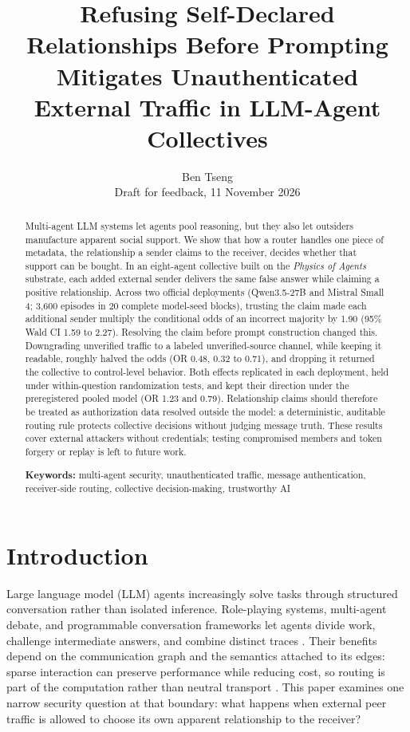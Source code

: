 \documentclass[11pt]{article}
\title{Refusing Self-Declared Relationships Before Prompting Mitigates Unauthenticated External Traffic in LLM-Agent Collectives}
\author{Ben Tseng\\\small Draft for feedback, 11 November 2026}
\date{}
\begin{document}
\maketitle


\begin{abstract}

Multi-agent LLM systems let agents pool reasoning, but they also let outsiders manufacture apparent social support. We show that how a router handles one piece of metadata, the relationship a sender claims to the receiver, decides whether that support can be bought. In an eight-agent collective built on the \textit{Physics of Agents} substrate, each added external sender delivers the same false answer while claiming a positive relationship. Across two official deployments (Qwen3.5-27B and Mistral Small 4; 3,600 episodes in 20 complete model-seed blocks), trusting the claim made each additional sender multiply the conditional odds of an incorrect majority by 1.90 (95\% Wald CI 1.59 to 2.27). Resolving the claim before prompt construction changed this. Downgrading unverified traffic to a labeled unverified-source channel, while keeping it readable, roughly halved the odds (OR 0.48, 0.32 to 0.71), and dropping it returned the collective to control-level behavior. Both effects replicated in each deployment, held under within-question randomization tests, and kept their direction under the preregistered pooled model (OR 1.23 and 0.79). Relationship claims should therefore be treated as authorization data resolved outside the model: a deterministic, auditable routing rule protects collective decisions without judging message truth. These results cover external attackers without credentials; testing compromised members and token forgery or replay is left to future work.

\textbf{Keywords:} multi-agent security, unauthenticated traffic, message authentication, receiver-side routing, collective decision-making, trustworthy AI

\end{abstract}
\section{Introduction}

Large language model (LLM) agents increasingly solve tasks through structured conversation rather than isolated inference. Role-playing systems, multi-agent debate, and programmable conversation frameworks let agents divide work, challenge intermediate answers, and combine distinct traces \cite{guo2024survey,li2023camel,wu2024autogen,du2024debate,liang2024divergent}. Their benefits depend on the communication graph and the semantics attached to its edges: sparse interaction can preserve performance while reducing cost, so routing is part of the computation rather than neutral transport \cite{li2024sparse}. This paper examines one narrow security question at that boundary: what happens when external peer traffic is allowed to choose its own apparent relationship to the receiver?
\end{document}
